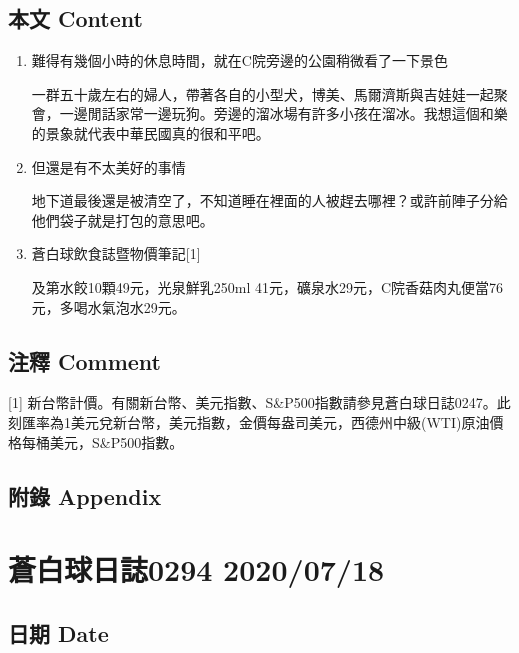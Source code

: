\documentclass[a5paper, 11pt
]{book}
\begin{document}
\hypertarget{ux672cux6587-content-41}{%
\subsection{本文 Content}\label{ux672cux6587-content-41}}

\begin{enumerate}
\def\labelenumi{\arabic{enumi}.}
\item
  難得有幾個小時的休息時間，就在C院旁邊的公園稍微看了一下景色

  一群五十歲左右的婦人，帶著各自的小型犬，博美、馬爾濟斯與吉娃娃一起聚會，一邊閒話家常一邊玩狗。旁邊的溜冰場有許多小孩在溜冰。我想這個和樂的景象就代表中華民國真的很和平吧。
\item
  但還是有不太美好的事情

  地下道最後還是被清空了，不知道睡在裡面的人被趕去哪裡？或許前陣子分給他們袋子就是打包的意思吧。
\item
  蒼白球飲食誌暨物價筆記{[}1{]}

  及第水餃10顆49元，光泉鮮乳250ml
  41元，礦泉水29元，C院香菇肉丸便當76元，多喝水氣泡水29元。
\end{enumerate}

\hypertarget{ux6ce8ux91cb-comment-41}{%
\subsection{注釋 Comment}\label{ux6ce8ux91cb-comment-41}}

{[}1{]}
新台幣計價。有關新台幣、美元指數、S\&P500指數請參見蒼白球日誌0247。此刻匯率為1美元兌新台幣，美元指數，金價每盎司美元，西德州中級(WTI)原油價格每桶美元，S\&P500指數。

\hypertarget{ux9644ux9304-appendix-41}{%
\subsection{附錄 Appendix}\label{ux9644ux9304-appendix-41}}

\hypertarget{ux84bcux767dux7403ux65e5ux8a8c0294-20200718}{%
\section{蒼白球日誌0294
2020/07/18}\label{ux84bcux767dux7403ux65e5ux8a8c0294-20200718}}

\hypertarget{ux65e5ux671f-date-42}{%
\subsection{日期 Date}\label{ux65e5ux671f-date-42}}
\end{document}
